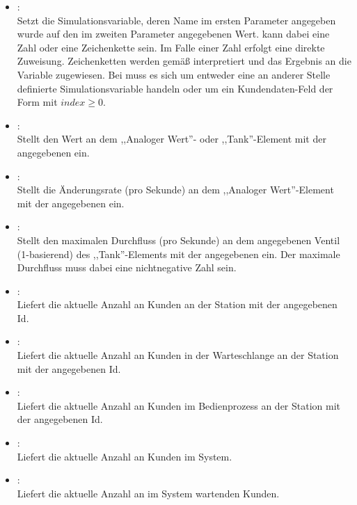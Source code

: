 \begin{itemize}

\item
{}:\\
Setzt die Simulationsvariable, deren Name im ersten Parameter angegeben wurde auf den im zweiten Parameter angegebenen Wert.
 kann dabei eine Zahl oder eine Zeichenkette sein. Im Falle einer Zahl erfolgt eine direkte Zuweisung.
Zeichenketten werden gemäß  interpretiert und das Ergebnis an die Variable zugewiesen. Bei 
muss es sich um entweder eine an anderer Stelle definierte Simulationsvariable handeln oder um ein Kundendaten-Feld der Form
 mit $index\ge0$.

\item
{}:\\
Stellt den Wert an dem ,,Analoger Wert''- oder ,,Tank''-Element mit der angegebenen  ein.
  
\item
{}:\\
Stellt die Änderungsrate (pro Sekunde) an dem ,,Analoger Wert''-Element mit der angegebenen  ein.
  
\item
{}:\\
Stellt den maximalen Durchfluss (pro Sekunde) an dem angegebenen Ventil (1-basierend) des ,,Tank''-Elements mit der angegebenen  ein.
Der maximale Durchfluss muss dabei eine nichtnegative Zahl sein. 

\item
{}:\\
Liefert die aktuelle Anzahl an Kunden an der Station mit der angegebenen Id.
  
\item
{}:\\
Liefert die aktuelle Anzahl an Kunden in der Warteschlange an der Station mit der angegebenen Id.

\item
{}:\\
Liefert die aktuelle Anzahl an Kunden im Bedienprozess an der Station mit der angegebenen Id.

\item
{}:\\
Liefert die aktuelle Anzahl an Kunden im System.
  
\item
{}:\\
Liefert die aktuelle Anzahl an im System wartenden Kunden.

\end{itemize}

